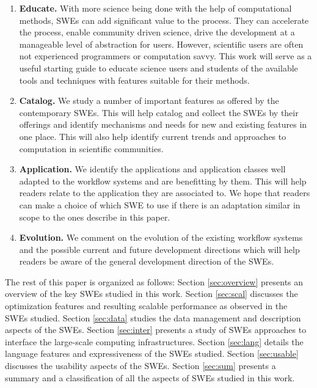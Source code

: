 \begin{enumerate}
\item \textbf{Educate.} With more science being done with the help of
computational methods, SWEs can add significant value to the process.  They can
accelerate the process, enable community driven science, drive the development
at a manageable level of abstraction for users.  However, scientific users are
often not experienced programmers or computation savvy. This work will serve as
a useful starting guide to educate science users and students of the available
tools and techniques with features suitable for their methods.

\item \textbf{Catalog.} We study a number of important features as offered by
the contemporary SWEs. This will help catalog and collect the SWEs by their
offerings and identify mechanisms and needs for new and existing features
in one place. This will also help identify current trends and approaches
to computation in scientific communities.

\item \textbf{Application.} We identify the applications and application
classes well adapted to the workflow systems and are benefitting by them.
This will help readers relate to the application they are associated to.
We hope that readers can make a choice of which SWE to use if there is an
adaptation similar in scope to the ones describe in this paper.

\item \textbf{Evolution.} We comment on the evolution of the existing workflow
systems and the possible current and future development directions which
will help readers be aware of the general development direction of the
SWEs.
\end{enumerate}

The rest of this paper is organized as follows: Section
\ref{sec:overview} presents an overview of the key SWEs studied in this work.
Section \ref{sec:scal} discusses the optimization features and resulting
scalable performance as observed in the SWEs studied. Section \ref{sec:data}
studies the data management and description aspects of the SWEs. Section
\ref{sec:inter} presents a study of SWEs approaches to interface the
large-scale computing infrastructures. Section \ref{sec:lang} details the
language features and expressiveness of the SWEs studied. Section
\ref{sec:usable} discusses the usability aspects of the SWEs.  Section
\ref{sec:sum} presents a summary and a classification of all the aspects of
SWEs studied in this work. 

